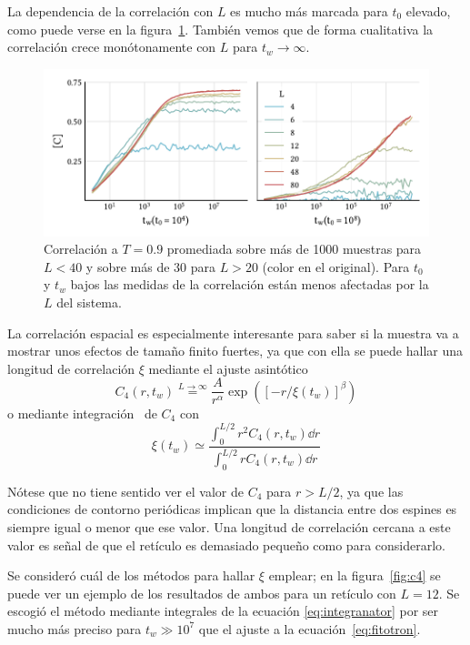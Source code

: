 \documentclass[11pt]{report}
\begin{document}
La dependencia de la correlación con $L$ es mucho más marcada para
$t_0$ elevado, como puede verse en la figura~\ref{fig:corrfunction_L}.
También vemos que de forma cualitativa la correlación crece
monótonamente con $L$ para $t_w→∞$.

\begin{figure}
  \centering
  \includegraphics{../study_cases/correlation_L_dependence/corrwithL.pdf}
  \caption{Correlación a $T=0.9$ promediada sobre más de 1000 muestras
    para $L<40$ y sobre más de 30 para $L>20$ (color en el original).
    Para $t_0$ y $t_w$ bajos las medidas de la correlación están menos
    afectadas por la $L$ del sistema.}
  \label{fig:corrfunction_L}
\end{figure}


La correlación espacial es especialmente interesante para
saber si la muestra va a mostrar unos efectos de tamaño finito
fuertes, ya que con ella se puede hallar una longitud de correlación
$ξ$ mediante el ajuste asintótico~\cite{c4fit}
\begin{equation}
  C_4 (r,t_w) \stackrel{L→∞}{=} \frac{A}{r^α} \exp \left( [-r/ξ(t_w)]^β \right)
  \label{eq:fitotron}
\end{equation}
o mediante integración~\cite{c4integration} de $C_4$ con
\begin{equation}
  ξ(t_w) ≃ \frac{\int_0^{L/2} r^2 C_4(r, t_w) \dd{r}}{\int_0^{L/2} r C_4(r, t_w) \dd{r}}
  \label{eq:integranator}
\end{equation}

Nótese que no tiene sentido ver el valor de $C_4$ para $r>L/2$, ya que
las condiciones de contorno periódicas implican que la distancia entre
dos espines es siempre igual o menor que ese valor. Una longitud de
correlación cercana a este valor es señal de que el retículo es
demasiado pequeño como para considerarlo.

Se consideró cuál de los métodos para hallar $ξ$ emplear; en la
figura~\ref{fig:c4} se puede ver un ejemplo de los resultados de ambos
para un retículo con $L=12$. Se escogió el método mediante integrales
de la ecuación \eqref{eq:integranator} por ser mucho más preciso para
$t_w≫10^7$ que el ajuste a la ecuación~\ref{eq:fitotron}.
\end{document}
